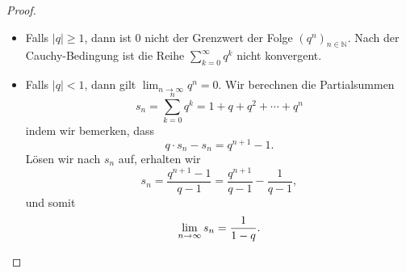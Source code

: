\documentclass[../main.tex]{subfiles}
\begin{document}
\begin{proof}
  \leavevmode
  \begin{itemize}
    \item Falls $|q| \geq 1$, dann ist $0$ nicht
      der Grenzwert der Folge ${(q^n)}_{n \in \mathbb{N}}$.
      Nach der Cauchy-Bedingung ist die Reihe
      $\sum_{k=0}^{\infty} q^k$ nicht konvergent.
    \item Falls $|q|<1$, dann gilt
      $\lim_{n \to \infty} q^n = 0$. Wir berechnen
      die Partialsummen
      \[
        s_n =  \sum_{k=0}^{n} q^k 
            = 1 + q + q^2 + \cdots + q^n
      \]
      indem wir bemerken, dass
      \[
        q \cdot s_n - s_n = q^{n+1} - 1.
      \]
      Lösen wir nach $s_n$ auf, erhalten wir
      \[
        s_n = \frac{q^{n+1} - 1}{q - 1}
        = \frac{q^{n+1}}{q-1} - \frac{1}{q-1},
      \]
      und somit
      \[
        \lim_{n \to \infty} s_n = \frac{1}{1-q}. \qedhere
      \]
  \end{itemize}
\end{proof}
\end{document}
